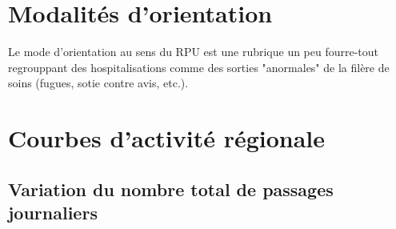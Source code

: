 \documentclass[12pt,english,french,twoside]{report}\usepackage[]{graphicx}\usepackage[]{color}
\begin{document}
\newpage
\chapter{Modalités d'orientation}



Le mode d'orientation au sens du RPU est une rubrique un peu fourre-tout regrouppant des hospitalisations comme des sorties "anormales" de la filère de soins (fugues, sotie contre avis, etc.).


\newpage
\chapter{Courbes d'activité régionale}

 

\section{Variation du nombre total de passages journaliers}
\end{document}
